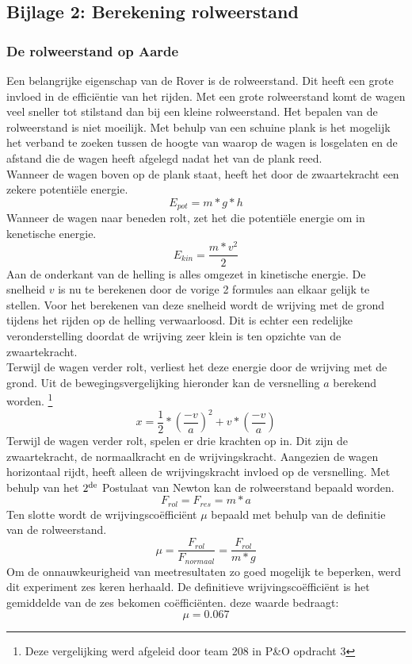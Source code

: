 \subsection{Bijlage 2: Berekening rolweerstand}

\subsubsection{De rolweerstand op Aarde}

Een belangrijke eigenschap van de Rover is de rolweerstand. Dit heeft een grote invloed in de effici\"entie van het rijden. Met een grote rolweerstand komt de wagen veel sneller tot stilstand dan bij een kleine rolweerstand. Het bepalen van de rolweerstand is niet moeilijk. Met behulp van een schuine plank is het mogelijk het verband te zoeken tussen de hoogte van waarop de wagen is losgelaten en de afstand die de wagen heeft afgelegd nadat het van de plank reed.\\
Wanneer de wagen boven op de plank staat, heeft het door de zwaartekracht een zekere potenti\"ele energie.
\begin{equation}
E_{pot}=m*g*h
\end{equation}
Wanneer de wagen naar beneden rolt, zet het die potenti\"ele energie om in kenetische energie.
\begin{equation}
E_{kin}=\frac{m*v^2}{2}
\end{equation}
Aan de onderkant van de helling is alles omgezet in kinetische energie. De snelheid $v$ is nu te berekenen door de vorige 2 formules aan elkaar gelijk te stellen. Voor het berekenen van deze snelheid wordt de wrijving met de grond tijdens het rijden op de helling verwaarloosd. Dit is echter een redelijke veronderstelling doordat de wrijving zeer klein is ten opzichte van de zwaartekracht.\\
Terwijl de wagen verder rolt, verliest het deze energie door de wrijving met de grond. Uit de bewegingsvergelijking hieronder kan de versnelling $a$ berekend worden.
\footnote{Deze vergelijking werd afgeleid door team 208 in P\&O opdracht 3}
\begin{equation}
x=\frac{1}{2}*\left(\frac{-v}{a}\right)^2+v*\left(\frac{-v}{a}\right)
\end{equation}
Terwijl de wagen verder rolt, spelen er drie krachten op in. Dit zijn de zwaartekracht, de normaalkracht en de wrijvingskracht. Aangezien de wagen horizontaal rijdt, heeft alleen de wrijvingskracht invloed op de versnelling. Met behulp van het $2\textsuperscript{de}$ Postulaat van Newton kan de rolweerstand bepaald worden.
\begin{equation}
F_{rol}=F_{res}=m*a
\end{equation}
Ten slotte wordt de wrijvingsco\"effici\"ent $\mu$ bepaald met behulp van de definitie van de rolweerstand.
\begin{equation}
\mu=\frac{F_{rol}}{F_{normaal}}=\frac{F_{rol}}{m*g}
\end{equation}
Om de onnauwkeurigheid van meetresultaten zo goed mogelijk te beperken, werd dit experiment zes keren herhaald. De definitieve wrijvingscoëffici\"ent is het gemiddelde van de zes bekomen coëfficiënten. deze waarde bedraagt:$$\mu=0.067$$
\pagebreak
